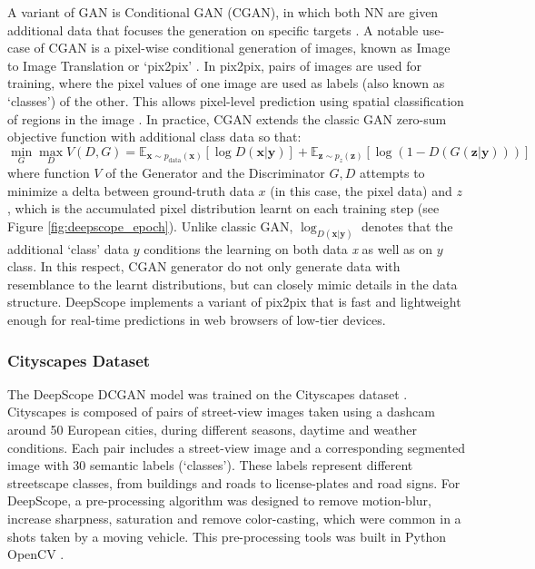 {    {
        A variant of GAN is Conditional GAN (CGAN), in which both NN are given additional data that focuses the generation on specific targets \cite{mirza2014conditional, salimans2016improved}. A notable use-case of CGAN is a pixel-wise conditional generation of images, known as Image to Image Translation or `pix2pix' \cite{isola2017image, pix2pix2016}. In pix2pix, pairs of images are used for training, where the pixel values of one image are used as labels (also known as `classes') of the other. This allows pixel-level prediction using spatial classification of regions in the image \cite{arjovsky2017wasserstein, zhu2017unpaired}. In practice, CGAN extends the classic GAN zero-sum objective function with additional class data so that:
        \begin{equation} \label{deepscope-gan-objective-function}
            \min_G \max_D V(D, G) = \mathbb{E}_{\bm{x} \sim p_{\text{data}}(\bm{x})}[\log D(\bm{x} | \bm{y})] + \mathbb{E}_{\bm{z} \sim p_z(\bm{z})}[\log (1 - D(G(\bm{z} | \bm{y})))]
        \end{equation}
        where function ${V}$ of the Generator and the Discriminator ${G, D}$ attempts to minimize a delta between ground-truth data ${x}$ (in this case, the pixel data) and ${z}$, which is the accumulated pixel distribution learnt on each training step (see Figure \eqref{fig:deepscope_epoch}). Unlike classic GAN, $\log_{D(\bm{x} | \bm{y})}$ denotes that the additional `class' data ${y}$ conditions the learning on both data \textit{x} as well as on ${y}$ class. In this respect, CGAN generator do not only generate data with resemblance to the learnt distributions, but can closely mimic details in the data structure. DeepScope implements a variant of pix2pix that is fast and lightweight enough for real-time predictions in web browsers of low-tier devices.
    }


    \subsubsection{Cityscapes Dataset}\label{cityscapes-dataset}
    {
        The DeepScope DCGAN model was trained on the Cityscapes dataset \cite{Cordts2016}. Cityscapes is composed of pairs of street-view images taken using a dashcam around 50 European cities, during different seasons, daytime and weather conditions. Each pair includes a street-view image and a corresponding segmented image with 30 semantic labels (`classes'). These labels represent different streetscape classes, from buildings and roads to license-plates and road signs. For DeepScope, a pre-processing algorithm was designed to remove motion-blur, increase sharpness, saturation and remove color-casting, which were common in a shots taken by a moving vehicle. This pre-processing tools was built in Python OpenCV \cite{opencv_library}.

}}
